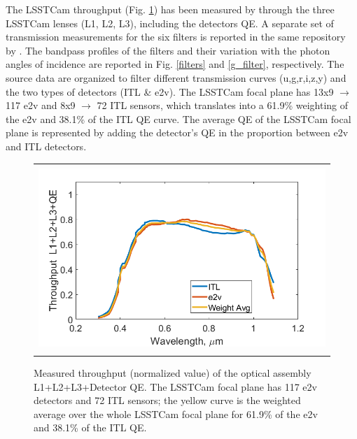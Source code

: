 \documentclass[SE,authoryear,toc]{lsstdoc}
\begin{document}
The LSSTCam throughput (Fig. \ref{L1L2L3QE}) has been measured by \cite{LSSTCam_Andy} through the three LSSTCam lenses (L1, L2, L3), including the detectors QE. A separate set of transmission measurements for the six filters is reported in the same repository by \cite{LSSTCam_Andy}. The bandpass profiles of the filters and their variation with the photon angles of incidence are reported in Fig. \ref{filters} and \ref{g_filter}, respectively.
The source data are organized to filter different transmission curves (u,g,r,i,z,y) and the two types of detectors (ITL \& e2v). The LSSTCam focal plane has 13x9 $\rightarrow$ 117 e2v and 8x9 $\rightarrow$  72 ITL sensors, which translates into a 61.9\% weighting of the e2v and 38.1\% of the ITL QE curve. The average QE of the LSSTCam focal plane is represented by adding the detector's QE in the proportion between e2v and ITL detectors.


\begin{figure}
\begin{center}
\begin{tabular}{c}
\includegraphics[height=7cm]{LSSTCam_lens_QE}
\end{tabular}
\end{center}
\caption 
{ \label{L1L2L3QE} Measured throughput (normalized value) of the optical assembly L1+L2+L3+Detector QE. The LSSTCam focal plane has 117 e2v detectors and 72 ITL sensors; the yellow curve is the weighted average over the whole LSSTCam focal plane for 61.9\% of the e2v and 38.1\% of the ITL QE.}
\end{figure} 
\end{document}
